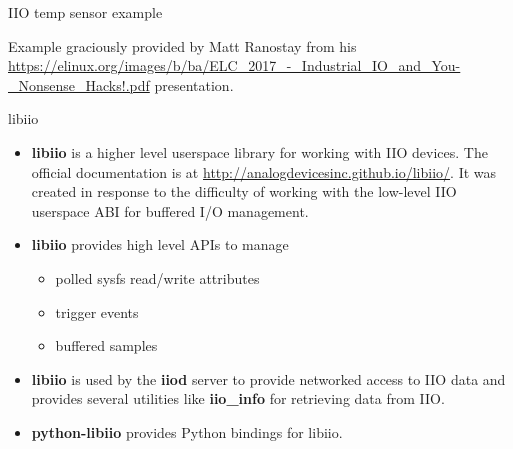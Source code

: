 \begin{frame}
    {IIO temp sensor example}

	Example graciously provided by Matt Ranostay from his \url{https://elinux.org/images/b/ba/ELC_2017_-_Industrial_IO_and_You-_Nonsense_Hacks!.pdf} presentation.

\end{frame}

\begin{frame}
    {libiio}
	\begin{itemize}
		\item
	\textbf{libiio} is a higher level userspace library for working with IIO devices. The official documentation is at \url{http://analogdevicesinc.github.io/libiio/}. It was created in response to the difficulty of working with the low-level IIO userspace ABI for buffered I/O management.

		\item
	\textbf{libiio} provides high level APIs to manage
	\begin{itemize}
		\item polled sysfs read/write attributes
		\item trigger events
		\item buffered samples
	\end{itemize}

		\item
	\textbf{libiio} is used by the \textbf{iiod} server to provide networked access to IIO data and provides several utilities like \textbf{iio\_info} for retrieving data from IIO.
		\item
	\textbf{python-libiio} provides Python bindings for libiio.
	\end{itemize}
\end{frame}

